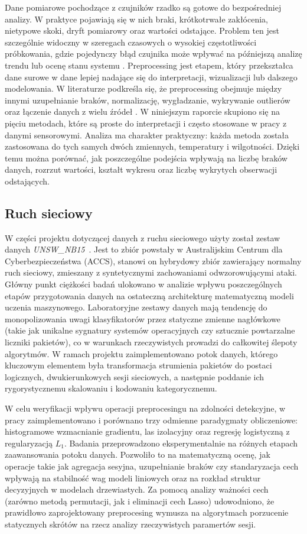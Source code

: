 \documentclass[12pt,twoside]{article}
\begin{document}
Dane pomiarowe pochodzące z czujników rzadko są gotowe do bezpośredniej analizy. 
W praktyce pojawiają się w nich braki, krótkotrwałe zakłócenia, nietypowe skoki, dryft pomiarowy oraz wartości odstające. 
Problem ten jest szczególnie widoczny w szeregach czasowych o wysokiej częstotliwości próbkowania, gdzie pojedynczy błąd czujnika może wpływać na późniejszą analizę trendu lub ocenę stanu systemu \cite{bib:ioe1}.
Preprocessing jest etapem, który przekształca dane surowe w dane lepiej nadające się do interpretacji, wizualizacji lub dalszego modelowania. 
W literaturze podkreśla się, że preprocessing obejmuje między innymi uzupełnianie braków, normalizację, wygładzanie, wykrywanie outlierów oraz łączenie danych z wielu źródeł \cite{bib:ioe2}.
W niniejszym raporcie skupiono się na pięciu metodach, które są proste do interpretacji i często stosowane w pracy z danymi sensorowymi.
Analiza ma charakter praktyczny: każda metoda została zastosowana do tych samych dwóch zmiennych, temperatury i wilgotności. 
Dzięki temu można porównać, jak poszczególne podejścia wpływają na liczbę braków danych, rozrzut wartości, kształt wykresu oraz liczbę wykrytych obserwacji odstających.

\subsection{Ruch sieciowy}

W części projektu dotyczącej danych z ruchu sieciowego użyty został zestaw danych \emph{UNSW\_NB15}~\cite{bib:datasetsieciowy}.
Jest to zbiór powstały w Australijskim Centrum dla Cyberbezpieczeństwa (ACCS), stanowi on hybrydowy zbiór zawierający normalny ruch sieciowy, zmieszany z syntetycznymi zachowaniami odwzorowującymi ataki.
Główny punkt ciężkości badań ulokowano w analizie wpływu poszczególnych etapów przygotowania danych na ostateczną architekturę matematyczną modeli uczenia maszynowego. 
Laboratoryjne zestawy danych mają tendencję do monopolizowania uwagi klasyfikatorów przez statyczne zmienne nagłówkowe (takie jak unikalne sygnatury systemów operacyjnych czy sztucznie powtarzalne liczniki pakietów), co w warunkach rzeczywistych prowadzi do całkowitej ślepoty algorytmów. 
W ramach projektu zaimplementowano potok danych, którego kluczowym elementem była transformacja strumienia pakietów do postaci logicznych, dwukierunkowych sesji sieciowych, a następnie poddanie ich rygorystycznemu skalowaniu i kodowaniu kategorycznemu.

W celu weryfikacji wpływu operacji preprocesingu na zdolności detekcyjne, w pracy zaimplementowano i porównano trzy odmienne paradygmaty obliczeniowe: histogramowe wzmacnianie gradientu, las izolacyjny oraz regresję logistyczną z regularyzacją $L_1$. 
Badania przeprowadzono eksperymentalnie na różnych etapach zaawansowania potoku danych. 
Pozwoliło to na matematyczną ocenę, jak operacje takie jak agregacja sesyjna, uzupełnianie braków czy standaryzacja cech wpływają na stabilność wag modeli liniowych oraz na rozkład struktur decyzyjnych w modelach drzewiastych. 
Za pomocą analizy ważności cech (zarówno metodą permutacji, jak i eliminacji cech Lasso) udowodniono, że prawidłowo zaprojektowany preprocesing wymusza na algorytmach porzucenie statycznych skrótów na rzecz analizy rzeczywistych paramertów sesji.
\end{document}
